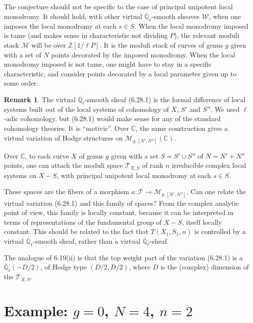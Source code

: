 \documentclass[11pt,a4paper]{article}
\theoremstyle{plain}
\theoremstyle{definition}
\newtheorem{remark}[theorem]{Remark}
\newcommand{\Ql}{\overline{\mathbb{Q}}_\ell}
\newcommand{\Z}{\mathbb{Z}}
\newcommand{\C}{\mathbb{C}}
\begin{document}
\subsection{}
The conjecture should not be specific to the case of principal unipotent local monodromy. It should hold, with other virtual $\Ql$-smooth sheaves $\mathcal{W}$, when one imposes the local monodromy at each $s \in S$. When the local monodromy imposed is tame (and makes sense in characteristic not dividing $P$), the relevant moduli stack $\mathcal{M}$ will be over $\Z[1/\ell P]$. It is the moduli stack of curves of genus $g$ given with a set of $N$ points decorated by the imposed monodromy. When the local monodromy imposed is not tame, one might have to stay in a specific characteristic, and consider points decorated by a local parameter given up to some order.

\begin{remark}\label{sec:general}
The virtual $\Ql$-smooth sheaf (6.28.1) is the formal difference of local systems built out of the local systems of cohomology of $X$, $S'$ and $S''$. We used $\ell$-adic cohomology, but (6.28.1) would make sense for any of the standard cohomology theories. It is ``motivic''. Over $\C$, the same construction gives a virtual variation of Hodge structures on $\mathcal{M}_{g,[N',N'']}(\C)$.

Over $\C$, to each curve $X$ of genus $g$ given with a set $S = S' \cup S''$ of $N = N' + N''$ points, one can attach the moduli space $\mathcal{T}_{X,S}$ of rank $n$ irreducible complex local systems on $X - S$, with principal unipotent local monodromy at each $s \in S$.

These spaces are the fibers of a morphism $a: \mathcal{T} \to \mathcal{M}_{g,[N',N'']}$. Can one relate the virtual variation (6.28.1) and this family of spaces? From the complex analytic point of view, this family is locally constant, because it can be interpreted in terms of representations of the fundamental group of $X - S$, itself locally constant. This should be related to the fact that $T(X_1,S_1,n)$ is controlled by a virtual $\Ql$-smooth sheaf, rather than a virtual $\Ql$-sheaf.

The analogue of 6.19(ii) is that the top weight part of the variation (6.28.1) is a $\Ql(-D/2)$, of Hodge type $(D/2, D/2)$, where $D$ is the (complex) dimension of the $\mathcal{T}_{X,S}$.
\end{remark}

\section{Example: $g = 0$, $N = 4$, $n = 2$}\label{sec:example}
\end{document}

